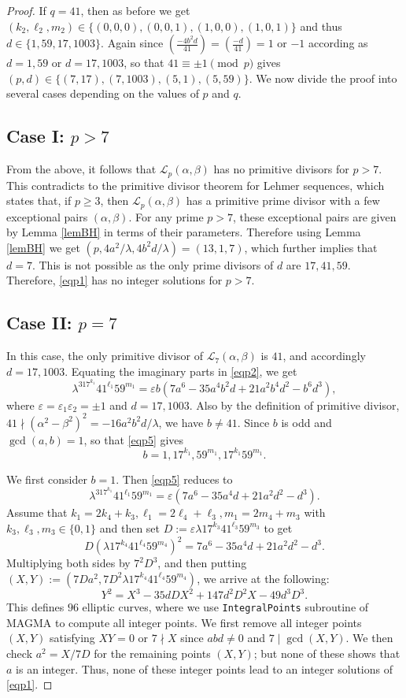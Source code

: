 \documentclass[10pt,a4paper]{amsart}
\begin{document}
\begin{proof}
If $q=41$, then as before we get  $(k_2, \ell_2, m_2)\in\{(0,0,0), (0,0,1), (1,0,0), (1,0,1)\}$ and thus $d\in\{1,59, 17, 1003\}$. Again since $\left(\frac{-4b^2d}{41}\right)=\left(\frac{-d}{41}\right)=1$ or $-1$ according as $d=1,59$ or $d=17, 1003$, so that $41\equiv \pm 1\pmod p$ gives $(p, d)\in\{(7,17),(7,1003), (5,1), (5,59)\}$. We now divide the proof into several cases depending on the values of $p$ and $q$.
\subsection*{Case I:  $p>7$} 
From the above, it follows that $\mathcal{L}_p(\alpha, \beta)$ has no primitive divisors for $p>7$. This contradicts to the primitive divisor theorem for Lehmer sequences, which states that, if $p\geq 3$, then $\mathcal{L}_p(\alpha, \beta)$ has a primitive prime divisor with a few exceptional pairs $(\alpha, \beta)$. For any prime $p> 7$, these exceptional pairs are given by Lemma \ref{lemBH} in terms of their parameters. Therefore using Lemma \ref{lemBH} we get $(p,4a^2/\lambda, 4b^2d/\lambda)=(13,1,7)$, which further implies that $d=7$. This is not possible as the only prime divisors of $d$ are $17, 41, 59$. Therefore, \eqref{eqp1} has no integer solutions for $p>7$. 
\subsection*{Case II:  $p=7$} 
In this case, the only primitive divisor of $\mathcal{L}_7(\alpha, \beta)$ is $41$, and accordingly  $d=17, 1003$. Equating the imaginary parts in \eqref{eqp2}, we get 
\begin{equation}\label{eqp5}
\lambda^317^{k_1}41^{\ell_1}59^{m_1}=\varepsilon b(7a^6-35a^4b^2d+21a^2b^4d^2-b^6d^3),
\end{equation}
where $\varepsilon=\varepsilon_1\varepsilon_2=\pm 1$ and $d=17, 1003$. Also by the definition of primitive divisor, $41\nmid (\alpha^2-\beta^2)^2=-16a^2b^2d/\lambda$, we have $b\ne 41$. Since $b$ is odd and $\gcd(a, b)=1$, so that \eqref{eqp5} gives 
$$b=1,17^{k_1},59^{m_1}, 17^{k_1}59^{m_1}.$$

We first consider $b=1$. Then \eqref{eqp5} reduces to
$$\lambda^317^{k_1}41^{\ell_1}59^{m_1}=\varepsilon (7a^6-35a^4d+21a^2d^2-d^3).$$
 Assume that $k_1=2k_4+k_3, \ell_1=2\ell_4+\ell_3, m_1=2m_4+m_3$ with $k_3, \ell_3, m_3\in\{0, 1\}$ and then set $D:=\varepsilon\lambda 17^{k_3}41^{\ell_3}59^{m_3}$ to get
$$D(\lambda 17^{k_4}41^{\ell_4}59^{m_4})^2=7a^6-35a^4d+21a^2d^2-d^3.$$
Multiplying both sides by $7^2D^3$, and then putting $(X, Y):=(7Da^2, 7D^2\lambda 17^{k_4}41^{\ell_4}59^{m_4})$, we arrive at the following:
$$Y^2=X^3-35dDX^2+147d^2D^2X-49d^3D^3.$$
This defines $96$ elliptic curves, where we use \texttt{IntegralPoints} subroutine of MAGMA to compute all integer points. We first remove all integer points $(X,Y)$ satisfying $XY=0$ or $7\nmid X$ since $abd\ne0$ and $7\mid \gcd(X,Y)$. We then check $a^2=X/{7D}$ for the remaining points $(X,Y)$; but none of these shows that $a$ is an integer. Thus, none of these integer points lead to an integer solutions of \eqref{eqp1}. 


\end{proof}
\end{document}

